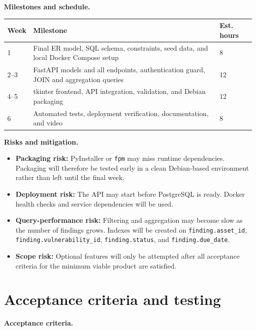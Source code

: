 \documentclass[11pt,a4paper]{article}
\begin{document}
\textbf{Milestones and schedule.}

\renewcommand{\arraystretch}{1.2}
\begin{tabularx}{\linewidth}{@{}p{1.4cm}Xp{1.8cm}@{}}
\toprule
\textbf{Week} & \textbf{Milestone} & \textbf{Est. hours} \\
\midrule
1 & Final ER model, SQL schema, constraints, seed data, and local Docker Compose
setup & 8 \\
2--3 & FastAPI models and all endpoints, authentication guard, JOIN and
aggregation queries & 12 \\
4--5 & tkinter frontend, API integration, validation, and Debian packaging & 12 \\
6 & Automated tests, deployment verification, documentation, and video & 8 \\
\bottomrule
\end{tabularx}

\textbf{Risks and mitigation.}

\begin{itemize}
  \item \textbf{Packaging risk:} PyInstaller or \texttt{fpm} may miss runtime
        dependencies. Packaging will therefore be tested early in a clean
        Debian-based environment rather than left until the final week.
  \item \textbf{Deployment risk:} The API may start before PostgreSQL is ready.
        Docker health checks and service dependencies will be used.
  \item \textbf{Query-performance risk:} Filtering and aggregation may become
        slow as the number of findings grows. Indexes will be created on
        \texttt{finding.asset\_id}, \texttt{finding.vulnerability\_id},
        \texttt{finding.status}, and \texttt{finding.due\_date}.
  \item \textbf{Scope risk:} Optional features will only be attempted after all
        acceptance criteria for the minimum viable product are satisfied.
\end{itemize}

\section{Acceptance criteria and testing}

\textbf{Acceptance criteria.}
\end{document}
